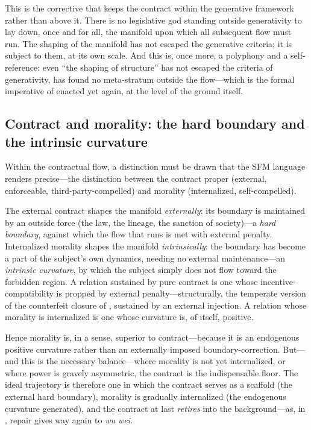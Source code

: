 This is the corrective that keeps the contract within the generative framework rather than above it. There is no legislative god standing outside generativity to lay down, once and for all, the manifold upon which all subsequent flow must run. The shaping of the manifold has not escaped the generative criteria; it is subject to them, at its own scale.  And this is, once more, a polyphony and a self-reference: even ``the shaping of structure'' has not escaped the criteria of generativity, has found no meta-stratum outside the flow---which is the formal imperative of  enacted yet again, at the level of the ground itself.

\subsection{Contract and morality: the hard boundary and the intrinsic curvature}
\label{p09:sec:contract-morality}

Within the contractual flow, a distinction must be drawn that the SFM language renders precise---the distinction between the contract proper (external, enforceable, third-party-compelled) and morality (internalized, self-compelled).

\begin{claim}
The external contract shapes the manifold \emph{externally}: its boundary is maintained by an outside force (the law, the lineage, the sanction of society)---a \emph{hard boundary}, against which the flow that runs is met with external penalty. Internalized morality shapes the manifold \emph{intrinsically}: the boundary has become a part of the subject's own dynamics, needing no external maintenance---an \emph{intrinsic curvature}, by which the subject simply does not flow toward the forbidden region. A relation sustained by pure contract is one whose incentive-compatibility is propped by external penalty---structurally, the temperate version of the counterfeit closure of , sustained by an external injection. A relation whose morality is internalized is one whose curvature is, of itself, positive.
\end{claim}

Hence morality is, in a sense, superior to contract---because it is an endogenous positive curvature rather than an externally imposed boundary-correction. But---and this is the necessary balance---where morality is not yet internalized, or where power is gravely asymmetric, the contract is the indispensable floor. The ideal trajectory is therefore one in which the contract serves as a scaffold (the external hard boundary), morality is gradually internalized (the endogenous curvature generated), and the contract at last \emph{retires} into the background---as, in , repair gives way again to \emph{wu wei}. 

